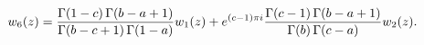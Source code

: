 \[w_{6}(z)=\frac{\mathop{\Gamma\/}\nolimits\!\left(1-c\right)\mathop{\Gamma\/}%
\nolimits\!\left(b-a+1\right)}{\mathop{\Gamma\/}\nolimits\!\left(b-c+1\right)%
\mathop{\Gamma\/}\nolimits\!\left(1-a\right)}w_{1}(z)+e^{(c-1)\pi i}\frac{%
\mathop{\Gamma\/}\nolimits\!\left(c-1\right)\mathop{\Gamma\/}\nolimits\!\left(%
b-a+1\right)}{\mathop{\Gamma\/}\nolimits\!\left(b\right)\mathop{\Gamma\/}%
\nolimits\!\left(c-a\right)}w_{2}(z).\]